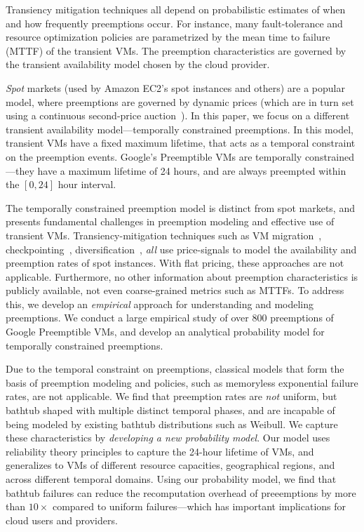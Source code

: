 Transiency mitigation techniques all depend on probabilistic estimates of when and how frequently preemptions occur.
%
For instance, many fault-tolerance and resource optimization policies are parametrized by the mean time to failure (MTTF) of the transient VMs. 
%
The preemption characteristics are governed by the transient availability model chosen by the cloud provider.


%
\emph{Spot} markets (used by Amazon EC2's spot instances and others) are a popular model, where preemptions are governed by dynamic prices (which are in turn set using a continuous second-price auction~\cite{spot-pricing2}). 
%
In this paper, we focus on a different transient availability model---temporally constrained preemptions.
%
In this model, transient VMs have a fixed maximum lifetime, that acts as a temporal constraint on the preemption events. 
%
Google's Preemptible VMs are temporally constrained---they have a maximum lifetime of 24 hours, and are always preempted within the $[0,24]$ hour interval.
%


The temporally constrained preemption model is distinct from spot markets, and presents fundamental challenges in preemption modeling and effective use of transient VMs. 
%
Transiency-mitigation techniques such as VM migration~\cite{spotcheck}, checkpointing~\cite{flint, marathe2014exploiting}, diversification~\cite{exosphere}, \emph{all} use price-signals to model the availability and preemption rates of spot instances. 
%
With flat pricing, these approaches are not applicable. 
%
Furthermore, no other information about preemption characteristics is publicly available, not even coarse-grained metrics such as MTTFs. 
%
To address this, we develop an \emph{empirical} approach for understanding and modeling preemptions. 
%
We conduct a large empirical study of over 800 preemptions of Google Preemptible VMs, and develop an analytical probability model for temporally constrained preemptions. 



%
Due to the temporal constraint on preemptions, classical models that form the basis of preemption modeling and policies, such as memoryless exponential failure rates, are not applicable. 
%
We find that preemption rates are \emph{not} uniform, but bathtub shaped with multiple distinct temporal phases, and are incapable of being modeled by existing bathtub distributions such as Weibull.
%
We capture these characteristics by \emph{developing a new probability model}. 
Our model uses reliability theory principles to capture the 24-hour lifetime of VMs, and generalizes to VMs of different resource capacities, geographical regions, and across different temporal domains.
%
Using our probability model, we find that bathtub failures can reduce the recomputation overhead of preeemptions by more than  $10\times$ compared to uniform failures---which has important implications for cloud users and providers. 


